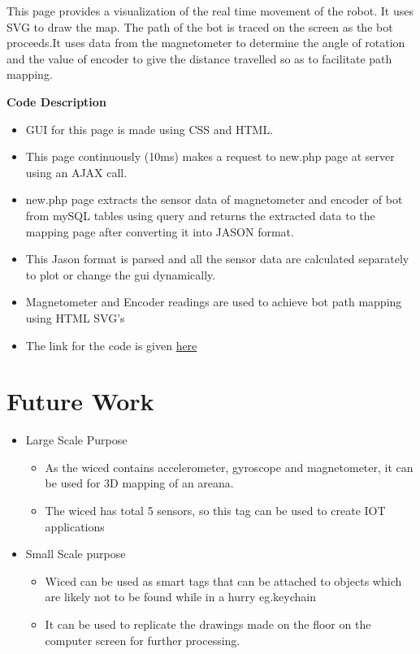 \documentclass[a4paper,12pt,oneside]{book}
\begin{document}
This page provides a visualization of the real time movement of the robot. It uses SVG to draw the map. The path of the bot is traced on the screen as the bot proceeds.It uses data from the magnetometer to determine the angle of rotation and the value of encoder to give the distance travelled so as to facilitate path mapping.

 \textbf{Code Description}
        
        \begin{itemize}
        \item GUI for this page is made using CSS and HTML.
        \item This page continuously (10ms) makes a request to new.php page at server using an AJAX call.
        \item new.php page extracts the sensor data of magnetometer and encoder of bot from mySQL tables using query and returns the extracted data to the mapping page after converting it into JASON format.
        \item This Jason format is parsed and all the sensor data are calculated separately to plot or change the gui dynamically.
        \item Magnetometer and Encoder readings are used to achieve bot path mapping using HTML SVG's
        \item The link for the code is given \href{https://github.com/eYSIP-2016/Wiced-Sense/blob/master/Codes/wiced%20web/javascript/mapping.js}{here}
        \end{itemize}














\newpage
\section{Future Work}
\begin{itemize}
\item{Large Scale Purpose}
\begin{itemize}
\item{As the wiced contains accelerometer, gyroscope and magnetometer, it can be used for 3D mapping of an areana.}
\item{The wiced has total 5 sensors, so this tag can be used to create IOT applications}
\end{itemize}
\item{Small Scale purpose}
\begin{itemize}
\item{Wiced can be used as smart tags that can be attached to objects which are likely not to be found while in a hurry eg.keychain}
\item {It can be used to replicate the drawings made on the floor on the computer screen for further processing.}
\end{itemize}
\end{itemize}
\end{document}
